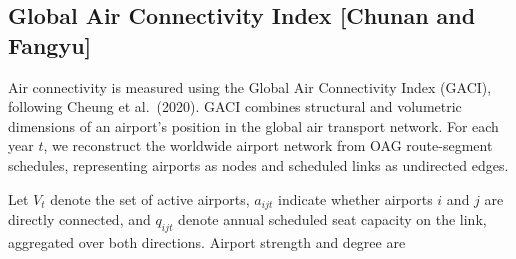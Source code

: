 \documentclass[12pt]{article}
\begin{document}
\begin{table}[H]
\centering
\caption{External validation of the aviation emissions inventory}
\label{tab:emissions_validation}
\end{table}

\subsection*{Global Air Connectivity Index [Chunan and Fangyu]}

Air connectivity is measured using the Global Air Connectivity Index (GACI), following Cheung et al.\ (2020). GACI combines structural and volumetric dimensions of an airport's position in the global air transport network. For each year $t$, we reconstruct the worldwide airport network from OAG route-segment schedules, representing airports as nodes and scheduled links as undirected edges.

Let $V_t$ denote the set of active airports, $a_{ijt}$ indicate whether airports $i$ and $j$ are directly connected, and $q_{ijt}$ denote annual scheduled seat capacity on the link, aggregated over both directions. Airport strength and degree are
\end{document}

